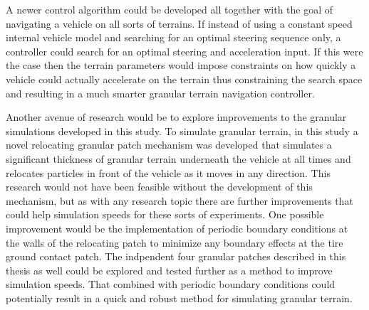 \documentclass[12pt,onecolumn]{report}
\begin{document}
A newer control algorithm could be developed all together with the goal of navigating a vehicle on all sorts of terrains. If instead of using a constant speed internal vehicle model and searching for an optimal steering sequence only, a controller could search for an optimal steering and acceleration input. If this were the case then the terrain parameters would impose constraints on how quickly a vehicle could actually accelerate on the terrain thus constraining the search space and resulting in a much smarter granular terrain navigation controller. 

Another avenue of research would be to explore improvements to the granular simulations developed in this study. To simulate granular terrain, in this study a novel relocating granular patch mechanism was developed that simulates a significant thickness of granular terrain underneath the vehicle at all times and relocates particles in front of the vehicle as it moves in any direction. This research would not have been feasible without the development of this mechanism, but as with any research topic there are further improvements that could help simulation speeds for these sorts of experiments. One possible improvement would be the implementation of periodic boundary conditions at the walls of the relocating patch to minimize any boundary effects at the tire ground contact patch. The indpendent four granular patches described in this thesis as well could be explored and tested further as a method to improve simulation speeds. That combined with periodic boundary conditions could potentially result in a quick and robust method for simulating granular terrain. 
\end{document}
